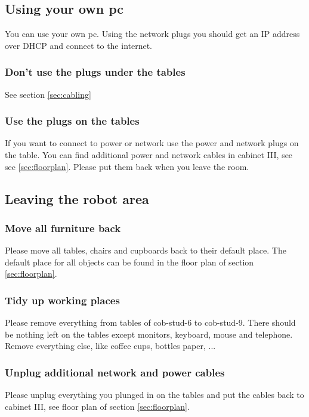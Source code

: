 \subsection{Using your own pc}
You can use your own pc. Using the network plugs you should get an IP address over DHCP and connect to the internet.

\subsubsection{Don't use the plugs under the tables}
See section \ref{sec:cabling}

\subsubsection{Use the plugs on the tables}
If you want to connect to power or network use the power and network plugs on the table. You can find additional power and network cables in cabinet III, see sec \ref{sec:floorplan}. Please put them back when you leave the room.

\subsection{Leaving the robot area}
\subsubsection{Move all furniture back}
Please move all tables, chairs and cupboards back to their default place. The default place for all objects can be found in the floor plan of section \ref{sec:floorplan}.

\subsubsection{Tidy up working places}\label{sec:tidyup}
Please remove everything from tables of cob-stud-6 to cob-stud-9. There should be nothing left on the tables except monitors, keyboard, mouse and telephone. Remove everything else, like coffee cups, bottles paper, ...

\subsubsection{Unplug additional network and power cables}
Please unplug everything you plunged in on the tables and put the cables back to cabinet III, see floor plan of section \ref{sec:floorplan}.

